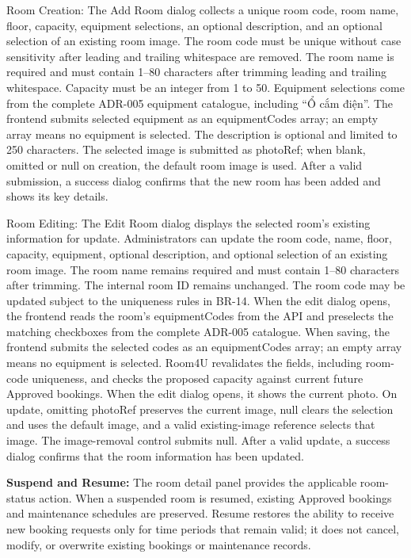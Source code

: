 Room Creation: The Add Room dialog collects a unique room code, room
name, floor, capacity, equipment selections, an optional description, and
an optional selection of an existing room image. The room code must be unique without case sensitivity after
leading and trailing whitespace are removed. The room name is required
and must contain 1--80 characters after trimming leading and trailing
whitespace. Capacity must be an integer from 1 to 50. Equipment
selections come from the complete ADR-005 equipment catalogue, including
``Ổ cắm điện''. The frontend submits
selected equipment as an equipmentCodes array; an empty array means no
equipment is selected. The description is optional and limited to 250
characters. The selected image is submitted as photoRef; when blank, omitted
or null on creation, the default room image is used. After a valid
submission, a success dialog confirms that the new room has been added
and shows its key details.

Room Editing: The Edit Room dialog displays the selected
room's existing information for update. Administrators
can update the room code, name, floor, capacity, equipment, optional
description, and optional selection of an existing room image. The room name remains required and must contain 1--80
characters after trimming. The internal room ID remains unchanged. The
room code may be updated subject to the uniqueness rules in BR-14. When
the edit dialog opens, the frontend reads the room's
equipmentCodes from the API and preselects the matching checkboxes from
the complete ADR-005 catalogue. When saving, the frontend submits the
selected codes as an equipmentCodes array; an empty array means no
equipment is selected. Room4U revalidates the fields, including
room-code uniqueness, and checks the proposed capacity against current
future Approved bookings. When the edit dialog opens, it shows the
current photo. On update, omitting photoRef preserves the current image,
null clears the selection and uses the default image, and a valid
existing-image reference selects that image. The image-removal control
submits null. After a valid update, a success dialog confirms that the
room information has been updated.

\textbf{Suspend and Resume:} The room detail panel provides the
applicable room-status action. When a suspended room is resumed,
existing Approved bookings and maintenance schedules are preserved.
Resume restores the ability to receive new booking requests only for
time periods that remain valid; it does not cancel, modify, or overwrite
existing bookings or maintenance records.

